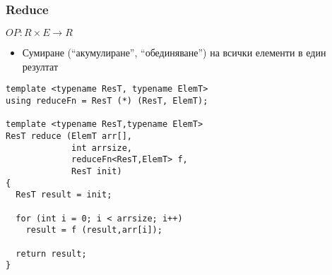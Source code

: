 \documentclass{beamer}
\begin{document}
\begin{frame}[fragile]
\frametitle{Reduce}

\begin{center}
$OP: R \times E \rightarrow R$
\end{center}

\begin{itemize}
  \item Сумиране (``акумулиране'', ``обединяване'') на всички елементи в един резултат
\end{itemize}

\begin{flushleft}
\begin{lstlisting}
template <typename ResT, typename ElemT>
using reduceFn = ResT (*) (ResT, ElemT);

template <typename ResT,typename ElemT>
ResT reduce (ElemT arr[], 
             int arrsize, 
             reduceFn<ResT,ElemT> f, 
             ResT init)
{
  ResT result = init;

  for (int i = 0; i < arrsize; i++)
    result = f (result,arr[i]);

  return result;
}
\end{lstlisting}  
\end{flushleft}

  
\end{frame}
\end{document}
